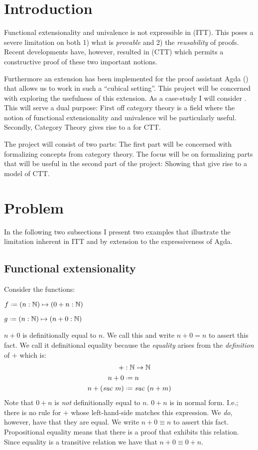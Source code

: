 \section{Introduction}
%
Functional extensionality and univalence is not expressible in
 (ITT). This poses a severe limitation
on both 1) what is \emph{provable} and 2) the \emph{reusability} of proofs.
Recent developments have, however, resulted in  (CTT)
which permits a constructive proof of these two important notions.

Furthermore an extension has been implemented for the proof assistant Agda
(\cite{agda}) that allows us to work in such a ``cubical setting''. This project
will be concerned with exploring the usefulness of this extension. As a
case-study I will consider . This will serve a dual
purpose: First off category theory is a field where the notion of functional
extensionality and univalence wil be particularly useful. Secondly, Category
Theory gives rise to a  for CTT.

The project will consist of two parts: The first part will be concerned with
formalizing concepts from category theory. The focus will be on formalizing
parts that will be useful in the second part of the project: Showing that
 give rise to a model of CTT.
%
\section{Problem}
%
In the following two subsections I present two examples that illustrate the
limitation inherent in ITT and by extension to the expressiveness of Agda.
%
\subsection{Functional extensionality}
Consider the functions:
%
\begin{multicols}{2}
$f \defeq (n : \bN) \mapsto (0 + n : \bN)$

$g \defeq (n : \bN) \mapsto (n + 0 : \bN)$
\end{multicols}
%
$n + 0$ is definitionally equal to $n$. We call this  and write $n + 0 = n$ to assert this fact. We call it definitional
equality because the \emph{equality} arises from the \emph{definition} of $+$
which is:
%
\newcommand{\suc}[1]{\mathit{suc}\ #1}
\begin{align*}
  +           & : \bN \to \bN              \\
  n + 0       & \defeq n                   \\
  n + (\suc{m}) & \defeq \suc{(n + m)}
\end{align*}
%
Note that $0 + n$ is \emph{not} definitionally equal to $n$. $0 + n$ is in
normal form. I.e.; there is no rule for $+$ whose left-hand-side matches this
expression. We \emph{do}, however, have that they are 
equal. We write $n + 0 \equiv n$ to assert this fact. Propositional equality
means that there is a proof that exhibits this relation. Since equality is a
transitive relation we have that $n + 0 \equiv 0 + n$.

